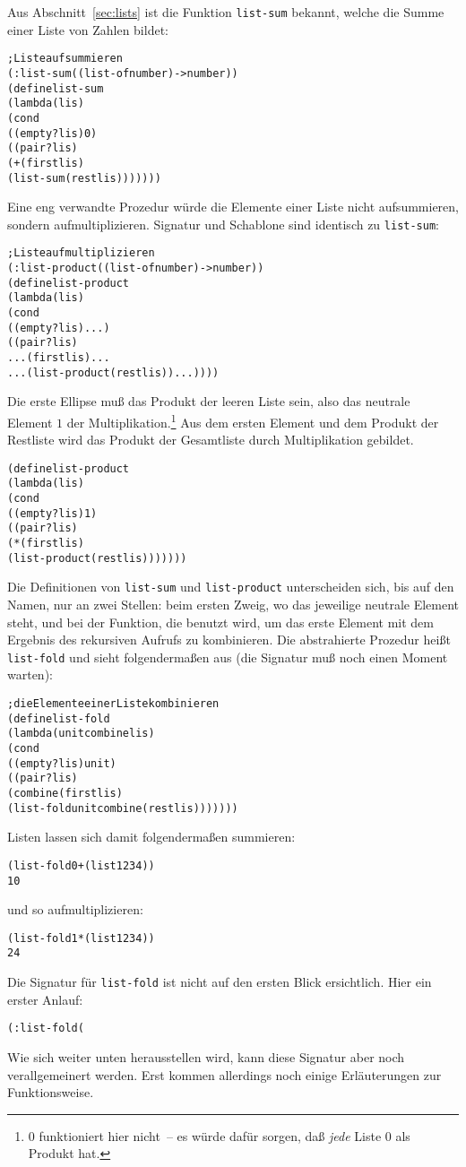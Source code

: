 Aus Abschnitt~\ref{sec:lists} ist die Funktion \texttt{list-sum}
bekannt, welche die Summe einer Liste von Zahlen bildet:
%
\begin{alltt}
; Liste aufsummieren
(: list-sum ((list-of number) -> number))
(define list-sum
  (lambda (lis)
    (cond
      ((empty? lis) 0)
      ((pair? lis) 
       (+ (first lis)
          (list-sum (rest lis)))))))
\end{alltt}
%
Eine eng verwandte Prozedur würde die Elemente einer Liste nicht
aufsummieren, sondern aufmultiplizieren.   Signatur und Schablone sind
identisch zu \texttt{list-sum}:
%
\begin{alltt}
; Liste aufmultiplizieren
(: list-product ((list-of number) -> number))
(define list-product
  (lambda (lis)
    (cond
      ((empty? lis) ...)
      ((pair? lis) 
       ... (first lis) ...
       ... (list-product (rest lis)) ...))))
\end{alltt}
%
Die erste Ellipse muß das Produkt der leeren Liste sein, also das
neutrale Element $1$ der Multiplikation.\footnote{0 funktioniert
  hier nicht~-- es würde dafür sorgen,
  daß \emph{jede} Liste 0 als Produkt hat.} 
Aus dem ersten Element und dem Produkt der
Restliste wird das Produkt der Gesamtliste durch
Multiplikation gebildet.
%
\begin{alltt}
(define list-product
  (lambda (lis)
    (cond
      ((empty? lis) 1)
      ((pair? lis) 
       (* (first lis)
          (list-product (rest lis)))))))
\end{alltt}
%
Die Definitionen von \texttt{list-sum} und \texttt{list-product}
unterscheiden sich, bis auf den Namen, nur an zwei Stellen: beim ersten
Zweig, wo das jeweilige neutrale Element steht, und bei der Funktion,
die benutzt wird, um das erste Element mit dem Ergebnis des rekursiven
Aufrufs zu kombinieren.  Die abstrahierte Prozedur heißt
\texttt{list-fold} und sieht folgendermaßen aus (die Signatur muß noch
einen Moment warten):
%
\begin{alltt}
; die Elemente einer Liste kombinieren
(define list-fold
  (lambda (unit combine lis)
    (cond
      ((empty? lis) unit)
      ((pair? lis) 
       (combine (first lis)
                (list-fold unit combine (rest lis)))))))
\end{alltt}
%
Listen lassen sich damit folgendermaßen summieren:
%
\begin{alltt}
(list-fold 0 + (list 1 2 3 4))
\evalsto{} 10
\end{alltt}
%
und so aufmultiplizieren:
%
\begin{alltt}
(list-fold 1 * (list 1 2 3 4))
\evalsto{} 24
\end{alltt}
%
Die Signatur für \texttt{list-fold} ist nicht auf den ersten Blick
ersichtlich.  Hier ein erster Anlauf:
%
\begin{alltt}
(: list-fold (%a (%a %a -> %a) (list-of %a) -> %a))
\end{alltt}
%
Wie sich weiter unten herausstellen wird, kann
diese Signatur aber
noch verallgemeinert werden.  Erst kommen allerdings noch einige
Erläuterungen zur Funktionsweise.

